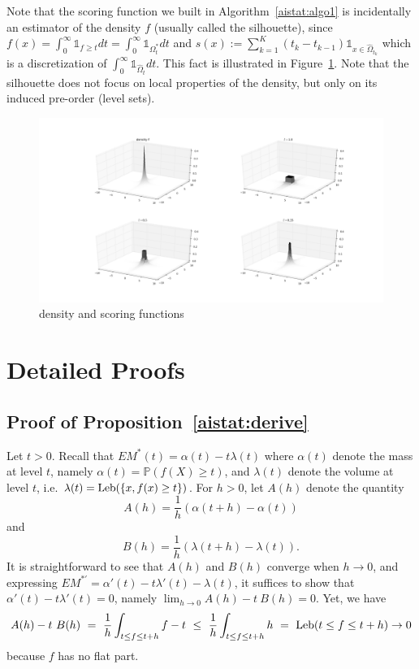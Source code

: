 Note that the scoring function we built in Algorithm~\ref{aistat:algo1} is incidentally an estimator of the density $f$ (usually called the silhouette), since $f(x)=\int_{0}^\infty \mathds{1}_{f \ge t}dt=\int_{0}^\infty \mathds{1}_{\Omega^*_t}dt$ and $s(x):= \sum_{k=1}^K (t_k-t_{k-1}) \mathds{1}_{x \in \hat{\Omega}_{t_k} }$ which is a discretization of $\int_{0}^\infty \mathds{1}_{\hat \Omega_t}dt$. This fact is illustrated in Figure~\ref{aistat:scoring3D}. Note that the silhouette does not focus on local properties of the density, but only on its induced pre-order (level sets).
\begin{figure}[!h!]
\centering
\includegraphics[width=\linewidth]{fig_source/scoring3D.png}
\caption{density and scoring functions} %
\label{aistat:scoring3D}
\end{figure}






\section{Detailed Proofs}
\label{aistat:sec:detailed_proofs}
\subsection*{Proof of Proposition~\ref{aistat:derive}} Let $t>0$. Recall that $EM^{*}(t)=\alpha(t)-t \lambda(t)$ where $\alpha(t)$ denote the mass at level $t$, namely $\alpha(t)=\mathbb{P}(f(X) \ge t)$, and $\lambda(t)$ denote the volume at level $t$, i.e. $\lambda(t)=\text{Leb}(\{x, f(x) \ge t\})$. For $h>0$, let $A(h)$ denote the quantity $$A(h)=\frac{1}{h}(\alpha(t+h)-\alpha(t))$$ and $$B(h)=\frac{1}{h} (\lambda(t+h)-\lambda(t)).$$ It is straightforward to see that $A(h)$ and $B(h)$ converge when $h \rightarrow 0$, and expressing $EM^{*'}=\alpha'(t)-t\lambda'(t)-\lambda(t)$, it suffices to show that $\alpha'(t)-t\lambda'(t)=0$, namely $\lim_{h \rightarrow 0} A(h) - t~B(h) = 0$. Yet, we have $$A(h)-t~B(h)~=~\frac{1}{h} \int_{t \le f \le t+h}f-t ~\le~ \frac{1}{h} \int_{t \le f \le t+h} h  ~=~ \text{Leb}(t \le f \le t+h) \rightarrow 0$$ because $f$ has no flat part.


